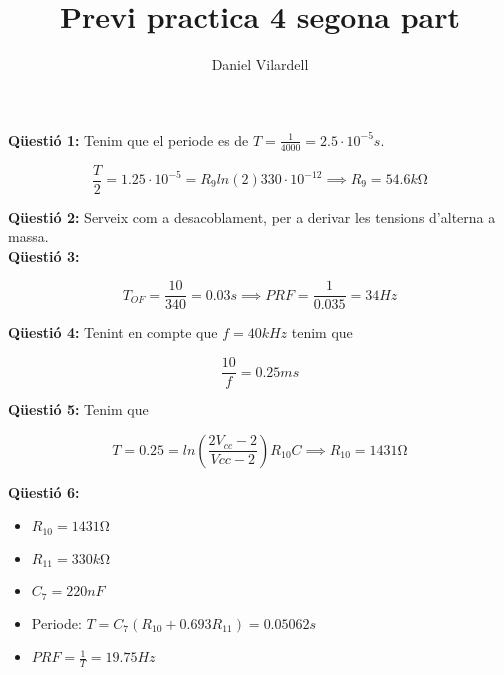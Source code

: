 \documentclass[12pt, a4papre]{article}
\author{Daniel Vilardell}
\title{Previ practica 4 segona part}
\date{}
\begin{document}
	\maketitle
	
	\textbf{Qüestió 1:} Tenim que el periode es de $T = \frac{1}{4000} = 2.5\cdot 10^{-5}s$.
	
	\[
		\frac{T}{2} = 1.25\cdot 10^{-5} = R_9ln(2)330\cdot10^{-12} \implies R_9 = 54.6k\si{\ohm}
	\]	
	
	\textbf{Qüestió 2:}  Serveix com a desacoblament, per a derivar les tensions d'alterna a massa.\\
	
	\textbf{Qüestió 3:} 
	
	\[
		T_{OF} = \frac{10}{340} = 0.03s \implies PRF = \frac{1}{0.035} = 34Hz
	\] 
	
	\textbf{Qüestió 4:} Tenint en compte que $f = 40kHz$ tenim que
	
	\[
		\frac{10}{f} = 0.25ms
	\] 
	
	\textbf{Qüestió 5:} Tenim que
	
	\[
		T = 0.25 = ln(\frac{2V_{cc}-2}{V{cc}-2})R_{10}C \implies R_{10} = 1431 \si{\ohm}
	\]
	
	\textbf{Qüestió 6:} 
	
	\begin{itemize}
		\item $R_10 = 1431\si{\ohm}$
		\item $R_11 = 330k\si{\ohm}$
		\item $C_7 = 220nF$
		\item Periode: $T = C_7(R_{10}+0.693R_{11}) = 0.05062s$
		\item $PRF = \frac{1}{T} = 19.75Hz$
	\end{itemize}
	
\end{document}
